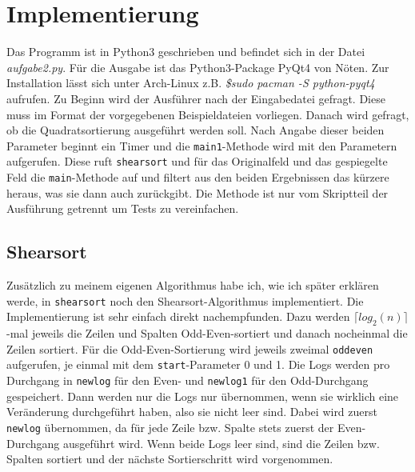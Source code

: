 \documentclass[12pt]{article}
\begin{document}
\section{Implementierung}
Das Programm ist in Python3 geschrieben und befindet sich in der Datei \textit{aufgabe2.py}. Für die Ausgabe ist das Python3-Package PyQt4 von Nöten. Zur Installation lässt sich unter Arch-Linux z.B. \textit{\$sudo pacman -S python-pyqt4} aufrufen. Zu Beginn wird der Ausführer nach der Eingabedatei gefragt. Diese muss im Format der vorgegebenen Beispieldateien vorliegen. Danach wird gefragt, ob die Quadratsortierung ausgeführt werden soll. Nach Angabe dieser beiden Parameter beginnt ein Timer und die \texttt{main1}-Methode wird mit den Parametern aufgerufen. Diese ruft \texttt{shearsort} und für das Originalfeld und das gespiegelte Feld die \texttt{main}-Methode auf und filtert aus den beiden Ergebnissen das kürzere heraus, was sie dann auch zurückgibt. Die Methode ist nur vom Skriptteil der Ausführung getrennt um Tests zu vereinfachen. 
\subsection{Shearsort}
Zusätzlich zu meinem eigenen Algorithmus habe ich, wie ich später erklären werde, in \texttt{shearsort} noch den Shearsort-Algorithmus implementiert. Die Implementierung ist sehr einfach direkt \cite{3} nachempfunden. Dazu werden $\lceil log_2(n)\rceil$-mal jeweils die Zeilen und Spalten Odd-Even-sortiert und danach nocheinmal die Zeilen sortiert. Für die Odd-Even-Sortierung wird jeweils zweimal \texttt{oddeven} aufgerufen, je einmal mit dem \texttt{start}-Parameter 0 und 1. Die Logs werden pro Durchgang in \texttt{newlog} für den Even- und \texttt{newlog1} für den Odd-Durchgang gespeichert. Dann werden nur die Logs nur übernommen, wenn sie wirklich eine Veränderung durchgeführt haben, also sie nicht leer sind. Dabei wird zuerst \texttt{newlog} übernommen, da für jede Zeile bzw. Spalte stets zuerst der Even-Durchgang ausgeführt wird. Wenn beide Logs leer sind, sind die Zeilen bzw. Spalten sortiert und der nächste Sortierschritt wird vorgenommen. 
\end{document}

